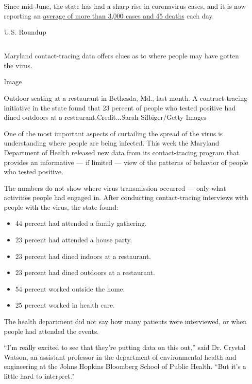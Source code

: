 Since mid-June, the state has had a sharp rise in coronavirus cases, and
it is now reporting an
\href{https://www.nytimes.com/interactive/2020/us/georgia-coronavirus-cases.html}{average
of more than 3,000 cases and 45 deaths} each day.

U.S. Roundup

\hypertarget{-8}{%
\subsection{}\label{-8}}

Maryland contact-tracing data offers clues as to where people may have
gotten the virus.

Image

Outdoor seating at a restaurant in Bethesda, Md., last month. A
contract-tracing initiative in the state found that 23 percent of people
who tested positive had dined outdoors at a restaurant.Credit...Sarah
Silbiger/Getty Images

One of the most important aspects of curtailing the spread of the virus
is understanding where people are being infected. This week the Maryland
Department of Health released new data from its contact-tracing program
that provides an informative --- if limited --- view of the patterns of
behavior of people who tested positive.

The numbers do not show where virus transmission occurred --- only what
activities people had engaged in. After conducting contact-tracing
interviews with people with the virus, the state found:

\begin{itemize}
\item
  44 percent had attended a family gathering.
\item
  23 percent had attended a house party.
\item
  23 percent had dined indoors at a restaurant.
\item
  23 percent had dined outdoors at a restaurant.
\item
  54 percent worked outside the home.
\item
  25 percent worked in health care.
\end{itemize}

The health department did not say how many patients were interviewed, or
when people had attended the events.

``I'm really excited to see that they're putting data on this out,''
said Dr. Crystal Watson, an assistant professor in the department of
environmental health and engineering at the Johns Hopkins Bloomberg
School of Public Health. ``But it's a little hard to interpret.''

